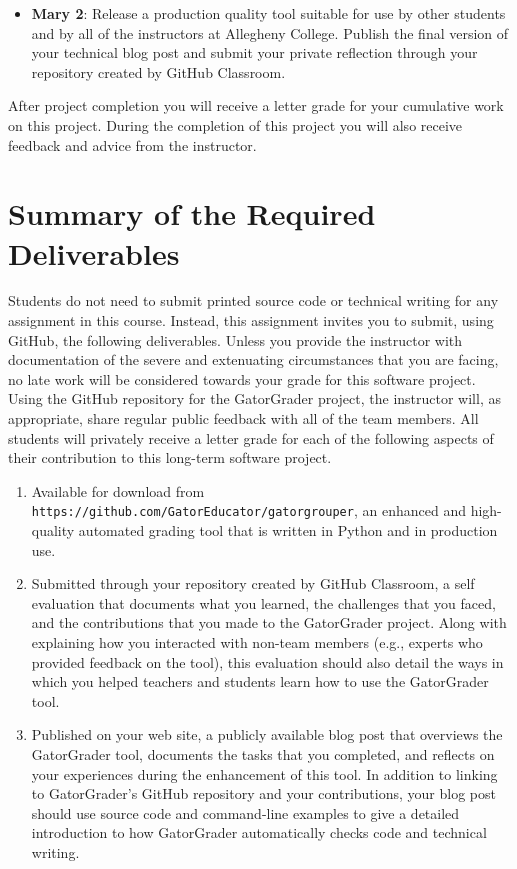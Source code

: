 \documentclass[11pt]{article}
\newcommand{\url}[1]{\lstinline{#1}}
\begin{document}
\begin{itemize}
  \item {\bf Mary 2}: Release a production quality tool suitable for use by
    other students and by all of the instructors at Allegheny College. Publish
    the final version of your technical blog post and submit your private
    reflection through your repository created by GitHub Classroom.

\end{itemize}

\noindent After project completion you will receive a letter grade for your
cumulative work on this project. During the completion of this project you will
also receive feedback and advice from the instructor.

\section*{Summary of the Required Deliverables}

\noindent Students do not need to submit printed source code or technical
writing for any assignment in this course. Instead, this assignment invites you
to submit, using GitHub, the following deliverables.
%
Unless you provide the instructor with documentation of the severe and
extenuating circumstances that you are facing, no late work will be considered
towards your grade for this software project.
%
Using the GitHub repository for the GatorGrader project, the instructor will, as
appropriate, share regular public feedback with all of the team members. All
students will privately receive a letter grade for each of the following aspects
of their contribution to this long-term software project.

\begin{enumerate}

\setlength{\itemsep}{0in}

\item Available for download from
  \url{https://github.com/GatorEducator/gatorgrouper}, an enhanced and
  high-quality automated grading tool that is written in Python and in
  production use.

\item Submitted through your repository created by GitHub Classroom, a self
  evaluation that documents what you learned, the challenges that you faced, and
  the contributions that you made to the GatorGrader project. Along with
  explaining how you interacted with non-team members (e.g., experts who
  provided feedback on the tool), this evaluation should also detail the ways in
  which you helped teachers and students learn how to use the GatorGrader tool.

\item Published on your web site, a publicly available blog post that overviews
  the GatorGrader tool, documents the tasks that you completed, and reflects on
  your experiences during the enhancement of this tool. In addition to linking
  to GatorGrader's GitHub repository and your contributions, your blog post
  should use source code and command-line examples to give a detailed
  introduction to how GatorGrader automatically checks code and technical
  writing.

\end{enumerate}
\end{document}

